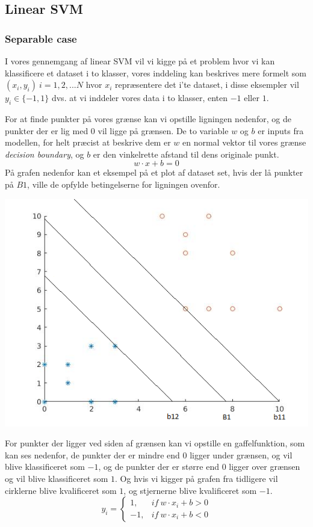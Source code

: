 \documentclass{article}
\begin{document}
\subsection{Linear SVM}
\subsubsection{Separable case}
I vores gennemgang af linear SVM vil vi kigge på et problem hvor vi kan klassificere et dataset i to klasser, vores inddeling kan beskrives mere formelt som $(x_i,y_i) \ i=1,2,...N$ hvor $x_i$ repræsentere det i'te dataset, i disse eksempler vil $y_i \in \{-1,1\}$ dvs. at vi inddeler vores data i to klasser, enten $-1$ eller $1$.

For at finde punkter på vores grænse kan vi opstille ligningen nedenfor, og de punkter der er lig med $0$ vil ligge på grænsen. De to variable $w$ og $b$ er inputs fra modellen, for helt præcist at beskrive dem er $w$ en normal vektor til vores grænse \textit{decision boundary}, og $b$ er den vinkelrette afstand til dens originale punkt.
$$w \cdot x + b = 0$$
På grafen nedenfor kan et eksempel på et plot af dataset set, hvis der lå punkter på $B1$, ville de opfylde betingelserne for ligningen ovenfor.
\begin{center}
	\includegraphics{svm_plot}
\end{center}

For punkter der ligger ved siden af grænsen kan vi opstille en gaffelfunktion, som kan ses nedenfor, de punkter der er mindre end $0$ ligger under grænsen, og vil blive klassificeret som $-1$, og de punkter der er større end $0$ ligger over grænsen og vil blive klassificeret som $1$. Og hvis vi kigger på grafen fra tidligere vil cirklerne blive kvalificeret som $1$, og stjernerne blive kvalificeret som $-1$.
$$
   y_i = \left\{
     \begin{array}{lr}
       1, & if \ w \cdot x_i + b > 0 \\
       -1, & if \ w \cdot x_i + b < 0
     \end{array}
   \right.
$$
\end{document}
